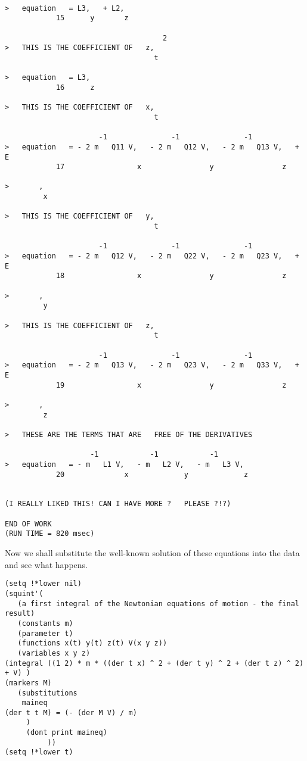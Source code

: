 \begin{verbatim}

>   equation   = L3,   + L2,
            15      y       z

                                     2
>   THIS IS THE COEFFICIENT OF   z,
                                   t

>   equation   = L3,
            16      z

>   THIS IS THE COEFFICIENT OF   x,
                                   t

                      -1               -1               -1
>   equation   = - 2 m   Q11 V,   - 2 m   Q12 V,   - 2 m   Q13 V,   + E
            17                 x                y                z

>       ,
         x

>   THIS IS THE COEFFICIENT OF   y,
                                   t

                      -1               -1               -1
>   equation   = - 2 m   Q12 V,   - 2 m   Q22 V,   - 2 m   Q23 V,   + E
            18                 x                y                z

>       ,
         y

>   THIS IS THE COEFFICIENT OF   z,
                                   t

                      -1               -1               -1
>   equation   = - 2 m   Q13 V,   - 2 m   Q23 V,   - 2 m   Q33 V,   + E
            19                 x                y                z

>       ,
         z

>   THESE ARE THE TERMS THAT ARE   FREE OF THE DERIVATIVES

                    -1            -1            -1
>   equation   = - m   L1 V,   - m   L2 V,   - m   L3 V,
            20              x             y             z


(I REALLY LIKED THIS! CAN I HAVE MORE ?   PLEASE ?!?)

END OF WORK
(RUN TIME = 820 msec)
\end{verbatim}

\bigskip

Now we shall substitute the well-known solution of these equations into the
data and see what happens.

\bigskip

\begin{verbatim}
(setq !*lower nil)
(squint'(
   (a first integral of the Newtonian equations of motion - the final result)
   (constants m)
   (parameter t)
   (functions x(t) y(t) z(t) V(x y z))
   (variables x y z)
(integral ((1 2) * m * ((der t x) ^ 2 + (der t y) ^ 2 + (der t z) ^ 2) + V) )
(markers M)
   (substitutions
    maineq
(der t t M) = (- (der M V) / m)
     )
     (dont print maineq)
          ))
(setq !*lower t)
\end{verbatim}

